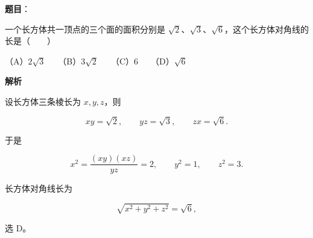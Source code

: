 \begin{answer}

\textbf{题目}：

一个长方体共一顶点的三个面的面积分别是 $\sqrt2$、$\sqrt3$、$\sqrt6$，这个长方体对角线的长是\mbox{（　　）}

（A）$2\sqrt3$　　（B）$3\sqrt2$　　（C）6　　（D）$\sqrt6$

\textbf{解析}

设长方体三条棱长为 $x,y,z$，则

\nopagebreak[4]
\[
xy=\sqrt2,\qquad yz=\sqrt3,\qquad zx=\sqrt6.
\]

于是

\nopagebreak[4]
\[
x^2=\frac{(xy)(xz)}{yz}=2,\qquad y^2=1,\qquad z^2=3.
\]

长方体对角线长为

\nopagebreak[4]
\[
\sqrt{x^2+y^2+z^2}=\sqrt6,
\]

选 D。


\end{answer}
